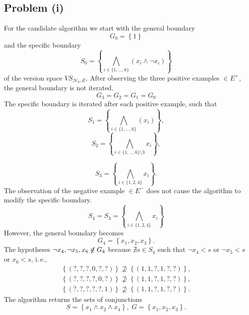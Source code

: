 \subsection*{Problem (i)}

For the candidate algorithm we start with the general boundary 
\[
G_{0}=\left\{ 1\right\} 
\]
and the specific boundary
\[
S_{0}=\left\{ \bigwedge_{i\in\{1,\ldots,6\}}\left(x_{i}\land\lnot x_{i}\right)\right\} 
\]
of the version space $\mathit{VS}_{\mathcal{H}_{6},E}$. After observing
the three positive examples $\in E^{+}$, the general boundary is
not iterated. 
\[
G_{3}=G_{2}=G_{1}=G_{0}
\]
The specific boundary is iterated after each positive example, such
that
\[
S_{1}=\left\{ \bigwedge_{i\in\{1,\ldots,6\}}\left(x_{i}\right)\right\} ,
\]
\[
S_{2}=\left\{ \bigwedge_{i\in\{1,\ldots,6\}\setminus3}x_{i}\right\} ,
\]


\[
S_{3}=\left\{ \bigwedge_{i\in\{1,2,4\}}x_{i}\right\} .
\]
The observation of the negative example $\in E^{-}$ does not cause
the algorithm to modify the specific boundary.
\[
S_{4}=S_{3}=\left\{ \bigwedge_{i\in\{1,2,4\}}x_{i}\right\} 
\]
However, the general boundary becomes
\[
G_{4}=\left\{ x_{1},x_{2},x_{3}\right\} .
\]
The hypotheses $\lnot x_{4},\lnot x_{5},x_{6}\not\not\in G_{4}$ because
$\nexists s\in S_{4}$ such that $\lnot x_{4}<s$ or $\lnot x_{5}<s$
or $x_{6}<s$, i.$\,$e., 
\[
\begin{gathered}\left\{ \left(?,?,?,0,?,?\right)\right\} \not\supseteq\left\{ \left(1,1,?,1,?,?\right)\right\} ,\\
\left\{ \left(?,?,?,?,0,?\right)\right\} \not\supseteq\left\{ \left(1,1,?,1,?,?\right)\right\} ,\\
\left\{ \left(?,?,?,?,?,1\right)\right\} \not\supseteq\left\{ \left(1,1,?,1,?,?\right)\right\} .
\end{gathered}
\]
The algorithm returns the sets of conjunctions
\[
S=\left\{ x_{1}\land x_{2}\land x_{4}\right\} ,\; G=\left\{ x_{1},x_{2},x_{3}\right\} .
\]